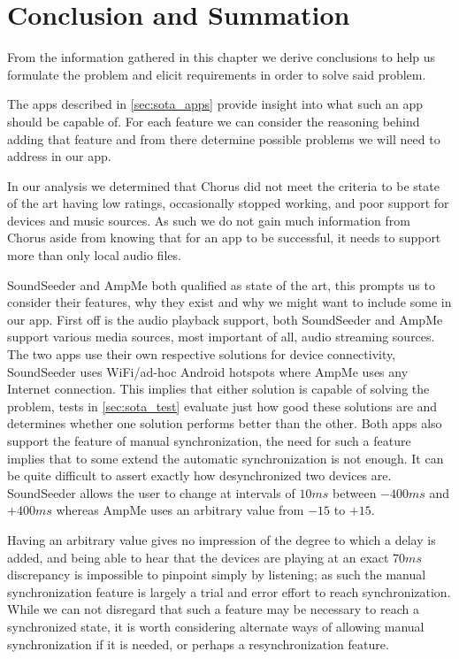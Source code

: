\section{Conclusion and Summation}
From the information gathered in this chapter we derive conclusions to help us formulate the problem and elicit requirements in order to solve said problem.

\bigskip
The apps described in \cref{sec:sota_apps} provide insight into what such an app should be capable of.
For each feature we can consider the reasoning behind adding that feature and from there determine possible problems we will need to address in our app.

In our analysis we determined that Chorus did not meet the criteria to be state of the art having low ratings, occasionally stopped working, and poor support for devices and music sources.
As such we do not gain much information from Chorus aside from knowing that for an app to be successful, it needs to support more than only local audio files.

SoundSeeder and AmpMe both qualified as state of the art, this prompts us to consider their features, why they exist and why we might want to include some in our app.
First off is the audio playback support, both SoundSeeder and AmpMe support various media sources, most important of all, audio streaming sources.
The two apps use their own respective solutions for device connectivity, SoundSeeder uses WiFi/ad-hoc Android hotspots where AmpMe uses any Internet connection.
This implies that either solution is capable of solving the problem, tests in \cref{sec:sota_test} evaluate just how good these solutions are and determines whether one solution performs better than the other.
Both apps also support the feature of manual synchronization, the need for such a feature implies that to some extend the automatic synchronization is not enough.
It can be quite difficult to assert exactly how desynchronized two devices are.
SoundSeeder allows the user to change at intervals of $10 ms$ between $-400 ms$ and $+400 ms$ whereas AmpMe uses an arbitrary value from $-15$ to $+15$.

Having an arbitrary value gives no impression of the degree to which a delay is added, and being able to hear that the devices are playing at an exact $70ms$ discrepancy is impossible to pinpoint simply by listening; as such the manual synchronization feature is largely a trial and error effort to reach synchronization.
While we can not disregard that such a feature may be necessary to reach a synchronized state, it is worth considering alternate ways of allowing manual synchronization if it is needed, or perhaps a resynchronization feature.

